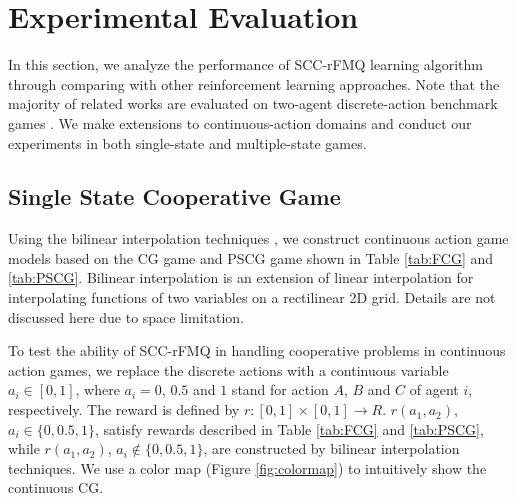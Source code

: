 \documentclass[journal,transmag]{IEEEtran}
\begin{document}






\section{Experimental Evaluation}
\label{experiment}
In this section, we analyze the performance of SCC-rFMQ learning algorithm through comparing with other reinforcement learning approaches. Note that the majority of related works are evaluated on two-agent discrete-action benchmark games \cite{Matignon2012,Wei2016LLI}. We make extensions to continuous-action domains and conduct our experiments in both single-state and multiple-state games.%

\subsection{Single State Cooperative Game}
\label{subsection4.1}

Using the bilinear interpolation techniques \cite{saharay2016}, we construct continuous action game models based on the CG game and PSCG game shown in Table  \ref{tab:FCG} and \ref{tab:PSCG}. Bilinear interpolation is an extension of linear interpolation for interpolating functions of two variables on a rectilinear 2D grid. Details are not discussed here due to space limitation.

To test the ability of SCC-rFMQ in handling cooperative problems in continuous action games, we replace the discrete actions with a continuous variable $a_i \in [0,1]$, where $a_i=0$, $0.5$ and $1$ stand for action $A$, $B$ and $C$ of agent $i$, respectively. The reward is defined by $r:[0,1]\times[0,1]\to R$. $r(a_1,a_2)$, $a_i \in \{0,0.5,1 \}$, satisfy rewards described in Table \ref{tab:FCG} and \ref{tab:PSCG}, while $r(a_1,a_2)$, $a_i \notin \{0,0.5,1\}$, are constructed by bilinear interpolation techniques. We use a color map (Figure \ref{fig:colormap}) to intuitively show the continuous CG.
\end{document}
